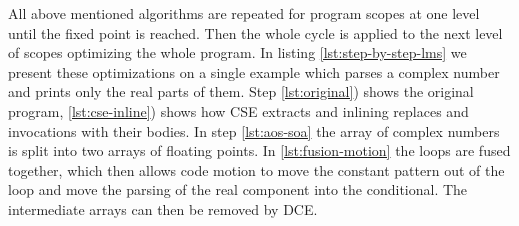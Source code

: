 All above mentioned algorithms are repeated for program scopes at one level until the fixed point is reached. Then the whole cycle is applied to the next level of scopes optimizing the whole program. In listing \ref{lst:step-by-step-lms} we present these optimizations on a single example which parses a complex number and prints only the real parts of them. Step \ref{lst:original}) shows the original program, \ref{lst:cse-inline}) shows how CSE extracts  and inlining replaces  and  invocations with their bodies. In step \ref{lst:aos-soa} the array  of complex numbers is split into two arrays of floating points. 
In \ref{lst:fusion-motion} the loops are fused together, which then allows code motion to move the constant pattern out of the loop and move the parsing of the real component into the conditional. The intermediate arrays can then be removed by DCE.

